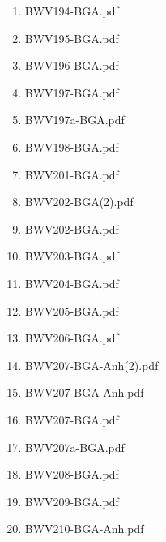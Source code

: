 \documentclass[11pt]{article}
\begin{document}
\begin{enumerate}
\begin{enumerate}
\begin{enumerate}
\item BWV194-BGA.pdf
\label{sec-1-1-1-1-44-6-7-1-222}

\item BWV195-BGA.pdf
\label{sec-1-1-1-1-44-6-7-1-223}

\item BWV196-BGA.pdf
\label{sec-1-1-1-1-44-6-7-1-224}

\item BWV197-BGA.pdf
\label{sec-1-1-1-1-44-6-7-1-225}

\item BWV197a-BGA.pdf
\label{sec-1-1-1-1-44-6-7-1-226}

\item BWV198-BGA.pdf
\label{sec-1-1-1-1-44-6-7-1-227}

\item BWV201-BGA.pdf
\label{sec-1-1-1-1-44-6-7-1-228}

\item BWV202-BGA(2).pdf
\label{sec-1-1-1-1-44-6-7-1-229}

\item BWV202-BGA.pdf
\label{sec-1-1-1-1-44-6-7-1-230}

\item BWV203-BGA.pdf
\label{sec-1-1-1-1-44-6-7-1-231}

\item BWV204-BGA.pdf
\label{sec-1-1-1-1-44-6-7-1-232}

\item BWV205-BGA.pdf
\label{sec-1-1-1-1-44-6-7-1-233}

\item BWV206-BGA.pdf
\label{sec-1-1-1-1-44-6-7-1-234}

\item BWV207-BGA-Anh(2).pdf
\label{sec-1-1-1-1-44-6-7-1-235}

\item BWV207-BGA-Anh.pdf
\label{sec-1-1-1-1-44-6-7-1-236}

\item BWV207-BGA.pdf
\label{sec-1-1-1-1-44-6-7-1-237}

\item BWV207a-BGA.pdf
\label{sec-1-1-1-1-44-6-7-1-238}

\item BWV208-BGA.pdf
\label{sec-1-1-1-1-44-6-7-1-239}

\item BWV209-BGA.pdf
\label{sec-1-1-1-1-44-6-7-1-240}

\item BWV210-BGA-Anh.pdf
\label{sec-1-1-1-1-44-6-7-1-241}


\end{enumerate}
\end{enumerate}
\end{enumerate}
\end{document}
